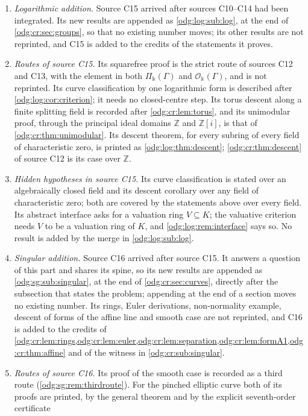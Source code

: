 \documentclass[11pt,oneside]{article}
\numberwithin{equation}{section}
\theoremstyle{definition}
\theoremstyle{remark}
\newcommand{\Z}{\mathbb Z}
\newcommand{\mergetag}{\textup{\textsf{\small[merge]}}}
\newcommand{\crP}{\Pi_\Bbbk(\Gamma)}
\newcommand{\crO}{\mathcal O_\Bbbk(\Gamma)}
\begin{document}
\begin{enumerate}[leftmargin=*]
\cref{odg:cr:prop:charp}) carry the tag \mergetag{} and have complete proofs.
\item \emph{Logarithmic addition.} Source C15 arrived after sources C10--C14 had been
integrated. Its new results are appended as \cref{odg:log:sub:log}, at the end of
\cref{odg:cr:sec:groups}, so that no existing number moves; its other results are not
reprinted, and C15 is added to the credits of the statements it proves.
\item \emph{Routes of source C15.} Its squarefree proof is the strict route of sources
C12 and C13, with the element in both $\crP$ and $\crO$, and is not reprinted. Its
curve classification by one logarithmic form is described after
\cref{odg:log:cor:criterion}; it needs no closed-centre step. Its torus descent along a
finite splitting field is recorded after \cref{odg:cr:lem:torus}, and its unimodular
proof, through the principal ideal domains $\Z$ and $\Z[i]$, is that of
\cref{odg:cr:thm:unimodular}. Its descent theorem, for every subring of every field of
characteristic zero, is printed as \cref{odg:log:thm:descent}; \cref{odg:cr:thm:descent}
of source C12 is its case over $\Z$.
\item \emph{Hidden hypotheses in source C15.} Its curve classification is stated over an
algebraically closed field and its descent corollary over any field of characteristic
zero; both are covered by the statements above over every field. Its abstract
interface asks for a valuation ring $V\subseteq K$; the valuative criterion needs $V$ to
be a valuation ring of $K$, and \cref{odg:log:rem:interface} says so. No result is added
by the merge in \cref{odg:log:sub:log}.
\item \emph{Singular addition.} Source C16 arrived after source C15. It answers a question
of this part and shares its spine, so its new results are appended as
\cref{odg:sg:sub:singular}, at the end of \cref{odg:cr:sec:curves}, directly after the
subsection that states the problem; appending at the end of a section moves no existing
number. Its rings, Euler derivations, non-normality example, descent of forms of the affine
line and smooth case are not reprinted, and C16 is added to the credits of
\cref{odg:cr:lem:rings,odg:cr:lem:euler,odg:cr:lem:separation,odg:cr:lem:formA1,odg:cr:thm:affine}
and of the witness in \cref{odg:cr:sub:singular}.
\item \emph{Routes of source C16.} Its proof of the smooth case is recorded as a third
route (\cref{odg:sg:rem:thirdroute}). For the pinched elliptic curve both of its proofs are
printed, by the general theorem and by the explicit seventh-order certificate

\end{enumerate}
\end{document}
